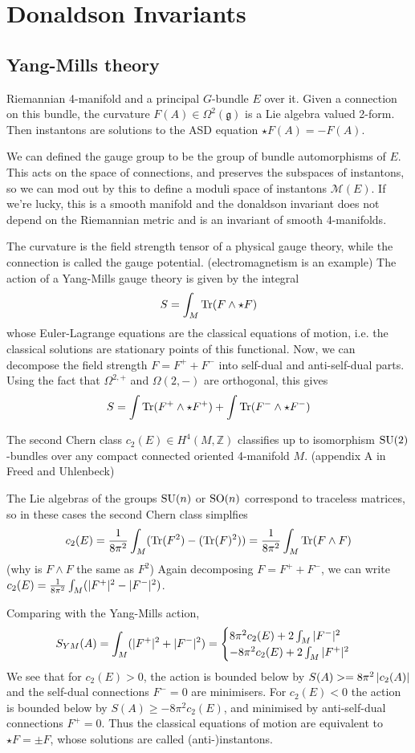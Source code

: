 
\chapter{Donaldson Invariants}
\label{chapter1}
\section{Yang-Mills theory}
Riemannian 4-manifold and a principal $G$-bundle $E$ over it. Given a connection
on this bundle, the curvature  $F(A)\in \Omega^2(\mathfrak{g})$ is a Lie algebra
valued 2-form. Then instantons are solutions to the ASD equation $\star F(A) =
-F(A)$. 

We can defined the gauge group to be the group of bundle automorphisms of  $E$.
This acts on the space of connections, and preserves the subspaces of
instantons, so we can mod out by this to define a moduli space of instantons
$\mathcal{M}(E)$. If we're lucky, this is a smooth manifold and the donaldson
invariant does not depend on the Riemannian metric and is an invariant of smooth
4-manifolds. 

The curvature is the field strength tensor of a physical gauge theory, while the
connection is called the gauge potential. (electromagnetism is an example)
The action of a Yang-Mills gauge theory is given by the integral
\[
S = \int_M \operatorname{Tr} (F\wedge \star F)
\] 
whose Euler-Lagrange equations are the classical equations of motion, i.e. the
classical solutions are stationary points of this functional. Now, we can
decompose the field strength $F = F^+ + F^-$ into self-dual and anti-self-dual
parts. Using the fact that $\Omega^{2,+}$ and $\Omega(2,-)$ are orthogonal, this 
gives 
\[
S = \int \operatorname{Tr}(F^{+}\wedge \star F^{+}) +\int \operatorname{Tr}(F^{-}\wedge \star F^{-})
\] 
\begin{thm}
	The second Chern class $c_2(E)\in H^4(M,\mathbb{Z})$ classifies up to
	isomorphism $\operatorname{SU}(2)$-bundles over any compact connected oriented 4-manifold
	 $M$. (appendix A in Freed and Uhlenbeck)
\end{thm}
The Lie algebras of the groups $\operatorname{SU}(n)$ or $\operatorname{SO}(n)$ correspond to traceless
matrices, so in these cases  the second Chern class simplfies 
\[
c_2(E) = \frac{1}{8\pi^2}\int_M (\operatorname{Tr}(F^2)-(\operatorname{Tr}(F)^2)) = 
\frac{1}{8\pi^2}\int_M \operatorname{Tr}(F\wedge F)
\] 
(why is $F\wedge F$ the same as  $F^2$)
Again decomposing $F=F^++F^-$, we can write  $c_2(E) = \frac{1}{8\pi^2}\int_M
(\abs[*]{F^+}^2-\abs[*]{F^-}^2)$. 

Comparing with the Yang-Mills action, 
\begin{align*}
	S_{YM}(A) = \int_M (\abs[*]{F^+}^2+\abs[*]{F^-}^2) 
	= \begin{cases}
		8\pi^2 c_2(E) + 2\int_M \abs[*]{F^-}^2 \\
		-8\pi^2 c_2(E) + 2\int_M \abs[*]{F^+}^2
	\end{cases}
\end{align*}
We see that for $c_2(E)>0$, the action is bounded below by 
$S(A) >= 8\pi^2\abs{c_2(A)}$ and the self-dual connections $F^-=0$ are
minimisers. For $c_2(E)<0$ the action is bounded
below by $S(A)\geq -8\pi^2c_2(E)$, and minimised by anti-self-dual connections
$F^+=0$. 
Thus the classical equations of motion are equivalent to $\star F = \pm F$,
whose solutions are called (anti-)instantons.

